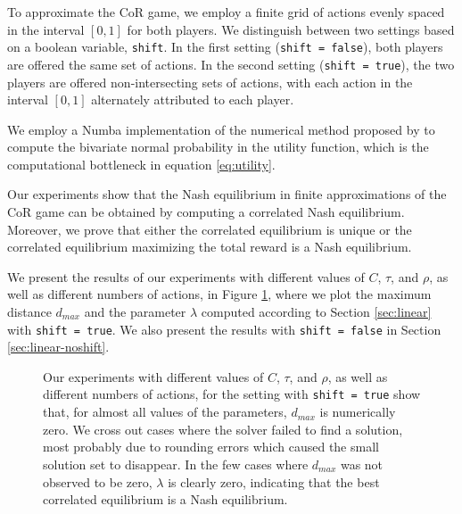 \documentclass[preprint,12pt,authoryear]{elsarticle}
\theoremstyle{definition}
\begin{document}
To approximate the CoR game, we employ a finite grid of actions evenly spaced in the interval $[0, 1]$ for both players. We distinguish between two settings based on a boolean variable, \texttt{shift}. In the first setting (\texttt{shift = false}), both players are offered the same set of actions. In the second setting (\texttt{shift = true}), the two players are offered non-intersecting sets of actions, with each action in the interval $[0, 1]$ alternately attributed to each player.

We employ a Numba \citep{lam2015numba}  implementation of the numerical method proposed by \citet{genz2004numerical} to compute the bivariate normal probability in the utility function, which is the computational bottleneck in equation \ref{eq:utility}.

Our experiments show that the Nash equilibrium in finite approximations of the CoR game can be obtained by computing a correlated Nash equilibrium. Moreover, we prove that either the correlated equilibrium is unique or the correlated equilibrium maximizing the total reward is a Nash equilibrium.

We present the results of our experiments with different values of $C$, $\tau$, and $\rho$, as well as different numbers of actions, in Figure \ref{fig:linear-shift}, where we plot the maximum distance $d_{max}$ and the parameter $\lambda$ computed according to Section \ref{sec:linear} with \texttt{shift = true}. We also present the results with \texttt{shift = false} in Section \ref{sec:linear-noshift}.

\begin{figure}[htbp]
  \centering
  \begin{minipage}[t]{0.48\textwidth}
    \centering
    
  \end{minipage}
  \hfill
  \begin{minipage}[t]{0.48\textwidth}
    \centering
    
  \end{minipage}
  \caption{Our experiments with different values of $C$, $\tau$, and $\rho$, as well as different numbers of actions, for the setting with \texttt{shift = true} show that, for almost all values of the parameters, $d_{max}$ is numerically zero. We cross out cases where the solver failed to find a solution, most probably due to rounding errors which caused the small solution set to disappear. In the few cases where $d_{max}$ was not observed to be zero, $\lambda$ is clearly zero, indicating that the best correlated equilibrium is a Nash equilibrium.}
  \label{fig:linear-shift}  
\end{figure}
\end{document}
